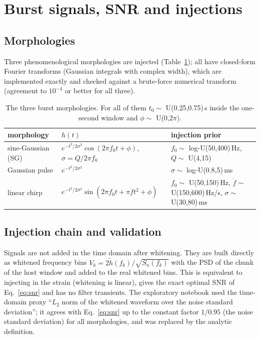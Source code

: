 \section{Burst signals, SNR and injections}\label{sec:signals}

\subsection{Morphologies}
Three phenomenological morphologies are injected (Table~\ref{tab:morph}); all have closed-form Fourier transforms (Gaussian integrals with complex width), which are implemented exactly and checked against a brute-force numerical transform
(agreement to $10^{-4}$ or better for all three).
\begin{table}[h]\centering\small
\begin{tabular}{llp{4.6cm}}
\toprule
morphology & $h(t)$ & injection prior\\
\midrule
sine-Gaussian (SG) & $e^{-t^2/2\sigma^2}\cos(2\pi f_0t+\phi)$, $\sigma=Q/2\pi f_0$ & $f_0\sim$ log-U(50,400)\,Hz, $Q\sim$ U(4,15)\\
Gaussian pulse & $e^{-t^2/2\sigma^2}$ & $\sigma\sim$ log-U(0.8,5)\,ms\\
linear chirp & $e^{-t^2/2\sigma^2}\sin(2\pi f_0t+\pi\dot ft^2+\phi)$ & $f_0\sim$ U(50,150)\,Hz, $\dot f\sim$ U(150,600)\,Hz/s, $\sigma\sim$ U(30,80)\,ms\\
\bottomrule
\end{tabular}
\caption{The three burst morphologies. For all of them $t_0\sim$ U(0.25,0.75)\,s inside the one-second window and $\phi\sim$ U(0,$2\pi$).}\label{tab:morph}
\end{table}

\subsection{Injection chain and validation}
Signals are not added in the time domain after whitening. They are built directly as whitened frequency bins $V_k=2\tilde h(f_k)/\sqrt{S_n(f_k)}$ with the PSD of the chunk of the host window and added to the real whitened bins.
This is equivalent to injecting in the strain (whitening is linear), gives the exact optimal SNR of Eq.~\eqref{eq:snr} and has no filter transients. The exploratory notebook used the time-domain proxy
``$L_2$ norm of the whitened waveform over the noise standard deviation''; it agrees with Eq.~\eqref{eq:snr} up to the constant factor $1/0.95$ (the noise standard deviation) for all morphologies, and was replaced by the analytic definition.

